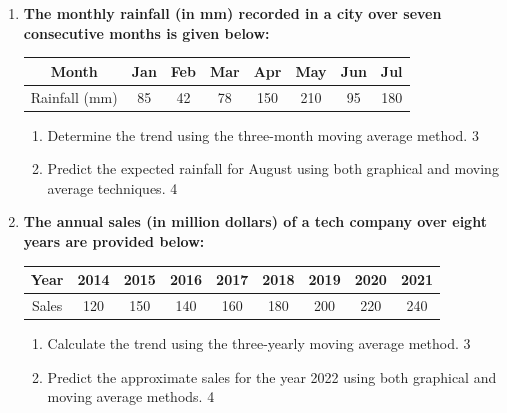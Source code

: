 \documentclass[a4paper,oneside]{book}
\begin{document}
\begin{enumerate}
\begin{enumerate}
\begin{enumerate}
\item
Compute the trend using the three-monthly moving average method. \hfill 3
\item
Estimate the approximate average temperature for the month of April using both graphical and moving average methods, and compare the projections. \hfill 4
\end{enumerate}

\item  
\textbf{The monthly rainfall (in mm) recorded in a city over seven consecutive months is given below:}  

\begin{table}[h]  
\centering  
\begin{tabular}{cccccccc}  
Month     & Jan  & Feb  & Mar  & Apr  & May  & Jun  & Jul  \\ \hline  
Rainfall (mm) & 85   & 42   & 78   & 150  & 210  & 95   & 180    
\end{tabular}  
\end{table}  

\begin{enumerate}  
    \item  
    Determine the trend using the three-month moving average method. \hfill 3  
    \item  
    Predict the expected rainfall for August using both graphical and moving average techniques. \hfill 4  
\end{enumerate}  


\item
\textbf{The annual sales (in million dollars) of a tech company over eight years are provided below:}

\begin{table}[h]
\centering
\begin{tabular}{ccccccccc}
Year     & 2014 & 2015 & 2016 & 2017 & 2018 & 2019 & 2020 & 2021 \\ \hline
Sales    & 120  & 150  & 140  & 160  & 180  & 200  & 220  & 240   
\end{tabular}
\end{table}

\begin{enumerate}
    \item  
    Calculate the trend using the three-yearly moving average method. \hfill 3
    \item
    Predict the approximate sales for the year 2022 using both graphical and moving average methods. \hfill 4
\end{enumerate}


\end{enumerate}
\end{enumerate}
\end{document}
